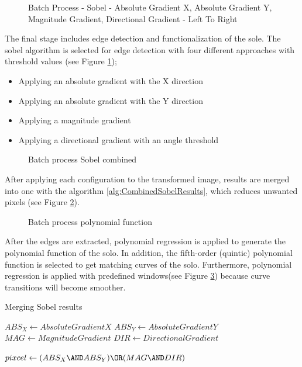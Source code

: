 \begin{figure}[htbp]
\centering
{}
\caption{Batch Process - Sobel - Absolute Gradient X, Absolute Gradient Y, Magnitude Gradient, Directional Gradient - Left To Right}
\label{fig:BatchProcessSobelOutput}
\end{figure}

The final stage includes edge detection and functionalization of the sole. The sobel algorithm is selected for edge detection with four different approaches with threshold values (see Figure \ref{fig:BatchProcessSobelOutput});

\begin{itemize}
  \item Applying an absolute gradient with the X direction
  \item Applying an absolute gradient with the Y direction
  \item Applying a magnitude gradient
  \item Applying a directional gradient with an angle threshold 
\end{itemize}

\begin{figure}[htbp]
\centering
{}
\caption{Batch process Sobel combined}
\label{fig:BatchProcessEdge}
\end{figure}

After applying each configuration to the transformed image, results are merged into one with the algorithm  \ref{alg:CombinedSobelResults}, which reduces unwanted pixels (see Figure \ref{fig:BatchProcessEdge}). 

\begin{figure}[htbp]
\centering
{}
\caption{Batch process polynomial function}
\label{fig:BatchProcessLine}
\end{figure}

After the edges are extracted, polynomial regression is applied to generate the polynomial function of the solo. In addition, the fifth-order (quintic) polynomial function is selected to get matching curves of the solo. Furthermore, polynomial regression is applied with predefined windows(see Figure \ref{fig:BatchProcessLine}) because curve transitions will become smoother.

\begin{algorithm}
\caption{Merging Sobel results}\label{alg:CombinedSobelResults}
\begin{algorithmic}

\STATE $ABS_X \gets Absolute Gradient X$
\STATE $ABS_Y \gets Absolute Gradient Y$
\STATE $MAG \gets Magnitude Gradient$
\STATE $DIR \gets Directional Gradient$

    \STATE $pixcel \gets (ABS_X \AND ABS_Y) \OR (MAG \AND DIR)$
\ENDFOR

\end{algorithmic}
\end{algorithm}

